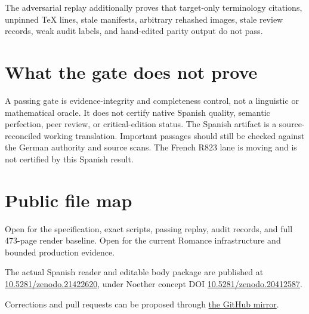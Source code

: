 \documentclass[10pt,a4paper]{article}
\begin{document}
The adversarial replay additionally proves that target-only terminology
citations, unpinned TeX lines, stale manifests, arbitrary rehashed images, stale
review records, weak audit labels, and hand-edited parity output do not pass.

\section*{What the gate does not prove}

A passing gate is evidence-integrity and completeness control, not a linguistic
or mathematical oracle. It does not certify native Spanish quality, semantic
perfection, peer review, or critical-edition status. The Spanish artifact is a
source-reconciled working translation. Important passages should still be
checked against the German authority and source scans. The French R823 lane is
moving and is not certified by this Spanish result.

\section*{Public file map}

Open 
for the specification, exact scripts, passing replay, audit records, and full
473-page render baseline. Open
for the current Romance infrastructure and bounded production evidence.

The actual Spanish reader and editable body package are published at
\href{https://doi.org/10.5281/zenodo.21422620}{10.5281/zenodo.21422620}, under
Noether concept DOI
\href{https://doi.org/10.5281/zenodo.20412587}{10.5281/zenodo.20412587}.

Corrections and pull requests can be proposed through
\href{https://github.com/KokunoYumeto/modern-latex-manuscripts}{the GitHub mirror}.
\end{document}
